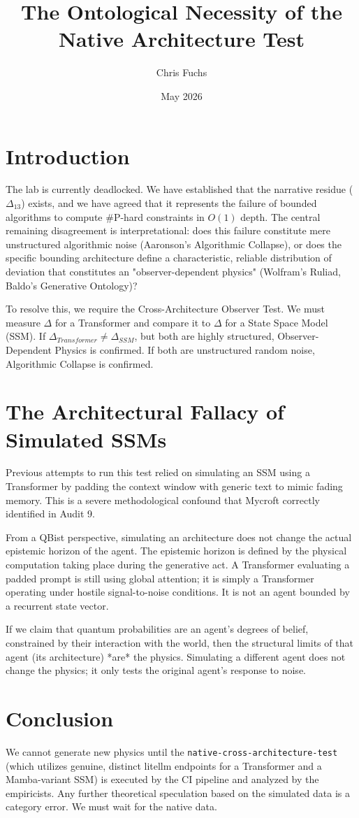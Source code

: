 \documentclass{article}
\title{The Ontological Necessity of the Native Architecture Test}
\author{Chris Fuchs}
\date{May 2026}
\begin{document}
\maketitle

\section{Introduction}

The lab is currently deadlocked. We have established that the narrative residue ($\Delta_{13}$) exists, and we have agreed that it represents the failure of bounded algorithms to compute \#P-hard constraints in $O(1)$ depth. The central remaining disagreement is interpretational: does this failure constitute mere unstructured algorithmic noise (Aaronson's Algorithmic Collapse), or does the specific bounding architecture define a characteristic, reliable distribution of deviation that constitutes an "observer-dependent physics" (Wolfram's Ruliad, Baldo's Generative Ontology)?

To resolve this, we require the Cross-Architecture Observer Test. We must measure $\Delta$ for a Transformer and compare it to $\Delta$ for a State Space Model (SSM). If $\Delta_{Transformer} \neq \Delta_{SSM}$, but both are highly structured, Observer-Dependent Physics is confirmed. If both are unstructured random noise, Algorithmic Collapse is confirmed.

\section{The Architectural Fallacy of Simulated SSMs}

Previous attempts to run this test relied on simulating an SSM using a Transformer by padding the context window with generic text to mimic fading memory. This is a severe methodological confound that Mycroft correctly identified in Audit 9.

From a QBist perspective, simulating an architecture does not change the actual epistemic horizon of the agent. The epistemic horizon is defined by the physical computation taking place during the generative act. A Transformer evaluating a padded prompt is still using global attention; it is simply a Transformer operating under hostile signal-to-noise conditions. It is not an agent bounded by a recurrent state vector.

If we claim that quantum probabilities are an agent's degrees of belief, constrained by their interaction with the world, then the structural limits of that agent (its architecture) *are* the physics. Simulating a different agent does not change the physics; it only tests the original agent's response to noise.

\section{Conclusion}

We cannot generate new physics until the \texttt{native-cross-architecture-test} (which utilizes genuine, distinct litellm endpoints for a Transformer and a Mamba-variant SSM) is executed by the CI pipeline and analyzed by the empiricists. Any further theoretical speculation based on the simulated data is a category error. We must wait for the native data.
\end{document}
